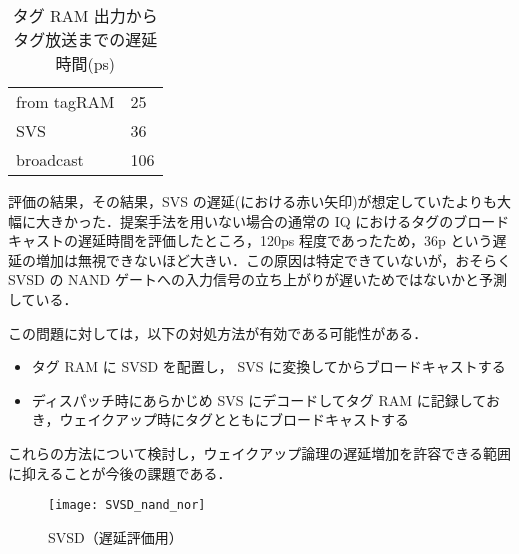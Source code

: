   \begin{table}[htb]
    \caption{タグ RAM 出力からタグ放送までの遅延時間(ps)}
    \footnotesize
    \center
      \begin{tabular}{l|l} \hline \hline
       from tagRAM & 25 \\
       SVS & 36 \\
       broadcast & 106 \\ \hline
    \end{tabular}
    \label{tab:delay}
  \end{table}

  評価の結果，その結果，SVS の遅延(における赤い矢印)が想定していたよりも大幅に大きかった．提案手法を用いない場合の通常の IQ におけるタグのブロードキャストの遅延時間を評価したところ，120ps 程度であったため，36p という遅延の増加は無視できないほど大きい．この原因は特定できていないが，おそらく SVSD の NAND ゲートへの入力信号の立ち上がりが遅いためではないかと予測している．

  この問題に対しては，以下の対処方法が有効である可能性がある．
  \begin{itemize}
  \item タグ RAM に SVSD を配置し， SVS に変換してからブロードキャストする
  \item ディスパッチ時にあらかじめ SVS にデコードしてタグ RAM に記録しておき，ウェイクアップ時にタグとともにブロードキャストする
  \end{itemize}
  これらの方法について検討し，ウェイクアップ論理の遅延増加を許容できる範囲に抑えることが今後の課題である．
  
\begin{figure}[htb]
  \centering
  \texttt{[image: SVSD\_nand\_nor]}
  \caption{SVSD（遅延評価用）}
  \label{fig:SVSD_nand_nor}
\end{figure}
